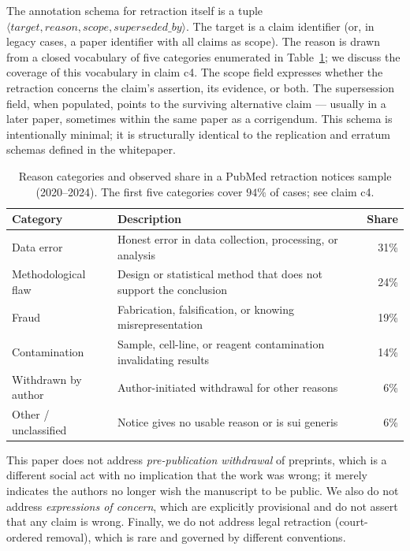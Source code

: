 \documentclass{rrxiv}
\begin{document}
The annotation schema for retraction itself is a tuple $\langle \mathit{target}, \mathit{reason}, \mathit{scope}, \mathit{superseded\_by} \rangle$. The target is a claim identifier (or, in legacy cases, a paper identifier with all claims as scope). The reason is drawn from a closed vocabulary of five categories enumerated in Table~\ref{tab:reasons}; we discuss the coverage of this vocabulary in claim c4. The scope field expresses whether the retraction concerns the claim's assertion, its evidence, or both. The supersession field, when populated, points to the surviving alternative claim --- usually in a later paper, sometimes within the same paper as a corrigendum. This schema is intentionally minimal; it is structurally identical to the replication and erratum schemas defined in the whitepaper.

\begin{table}[h]
\centering
\small
\begin{tabular}{lp{6.5cm}r}
\hline
Category & Description & Share \\
\hline
Data error & Honest error in data collection, processing, or analysis & 31\% \\
Methodological flaw & Design or statistical method that does not support the conclusion & 24\% \\
Fraud & Fabrication, falsification, or knowing misrepresentation & 19\% \\
Contamination & Sample, cell-line, or reagent contamination invalidating results & 14\% \\
Withdrawn by author & Author-initiated withdrawal for other reasons & 6\% \\
Other / unclassified & Notice gives no usable reason or is sui generis & 6\% \\
\hline
\end{tabular}
\caption{Reason categories and observed share in a PubMed retraction notices sample (2020--2024). The first five categories cover $94\%$ of cases; see claim c4.}
\label{tab:reasons}
\end{table}

\begin{scope}
This paper does not address \emph{pre-publication withdrawal} of preprints, which is a different social act with no implication that the work was wrong; it merely indicates the authors no longer wish the manuscript to be public. We also do not address \emph{expressions of concern}, which are explicitly provisional and do not assert that any claim is wrong. Finally, we do not address legal retraction (court-ordered removal), which is rare and governed by different conventions.
\end{scope}
\end{document}
